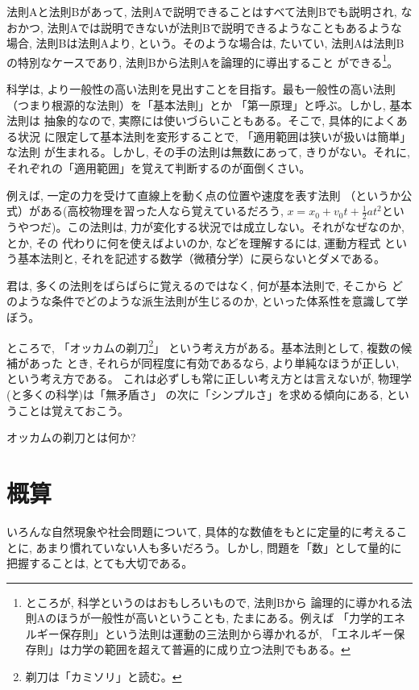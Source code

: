 法則Aと法則Bがあって, 法則Aで説明できることはすべて法則Bでも説明され, 
なおかつ, 法則Aでは説明できないが法則Bで説明できるようなこともあるような
場合, 法則Bは法則Aより, という。そのような場合は, たいてい, 
法則Aは法則Bの特別なケースであり, 法則Bから法則Aを論理的に導出すること
ができる\footnote{ところが, 科学というのはおもしろいもので, 法則Bから
論理的に導かれる法則Aのほうが一般性が高いということも, たまにある。例えば
「力学的エネルギー保存則」という法則は運動の三法則から導かれるが, 
「エネルギー保存則」は力学の範囲を超えて普遍的に成り立つ法則でもある。}。

科学は, より一般性の高い法則を見出すことを目指す。最も一般性の高い法則
（つまり根源的な法則）を「基本法則」とか
「第一原理」と呼ぶ。しかし, 基本法則は
抽象的なので, 実際には使いづらいこともある。そこで, 具体的によくある状況
に限定して基本法則を変形することで, 「適用範囲は狭いが扱いは簡単」な法則
が生まれる。しかし, その手の法則は無数にあって, きりがない。それに, 
それぞれの「適用範囲」を覚えて判断するのが面倒くさい。

例えば, 一定の力を受けて直線上を動く点の位置や速度を表す法則
（というか公式）がある(高校物理を習った人なら覚えているだろう, 
$x=x_0+v_0t+\frac{1}{2}at^2$というやつだ)。この法則は, 
力が変化する状況では成立しない。それがなぜなのか, とか, その
代わりに何を使えばよいのか, などを理解するには, 運動方程式
という基本法則と, それを記述する数学（微積分学）に戻らないとダメである。

君は, 多くの法則をばらばらに覚えるのではなく, 何が基本法則で, そこから
どのような条件でどのような派生法則が生じるのか, といった体系性を意識して学ぼう。\mv

ところで, 「オッカムの剃刀\footnote{剃刀は「カミソリ」と読む。}」
という考え方がある。基本法則として, 複数の候補があった
とき, それらが同程度に有効であるなら, より単純なほうが正しい, という考え方である。
これは必ずしも常に正しい考え方とは言えないが, 物理学(と多くの科学)は「無矛盾さ」
の次に「シンプルさ」を求める傾向にある, ということは覚えておこう。\mv

\begin{q}\label{q:OccamsRazor}
オッカムの剃刀とは何か?
\end{q}
\hv



\section{概算}
いろんな自然現象や社会問題について, 具体的な数値をもとに定量的に考えることに, 
あまり慣れていない人も多いだろう。しかし, 問題を「数」として量的に把握することは, 
とても大切である。\mv

